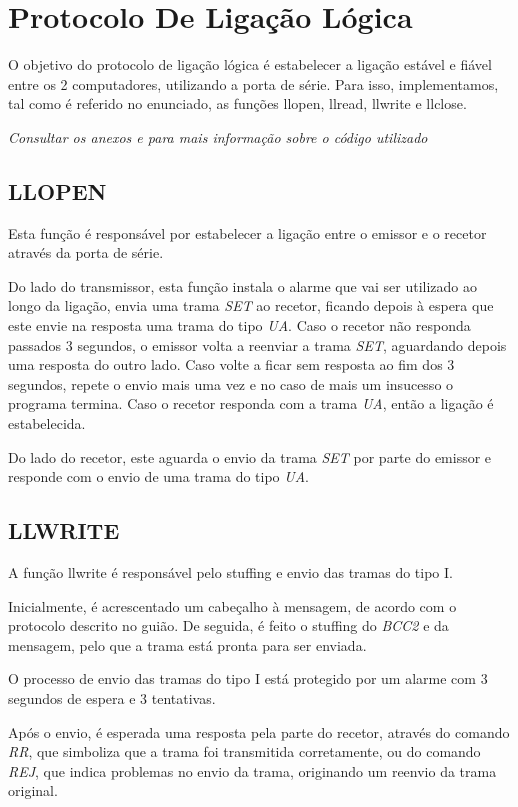 \documentclass[11pt]{article}
\begin{document}
\section{Protocolo De Ligação Lógica}

O objetivo do protocolo de ligação lógica é estabelecer a ligação estável e fiável entre os 2 computadores, utilizando a porta de série. Para isso, implementamos, tal como é referido no enunciado, as funções llopen, llread, llwrite e llclose.

\textit{Consultar os anexos  e  para mais informação sobre o código utilizado }

\subsection{LLOPEN}

Esta função é responsável por estabelecer a ligação entre o emissor e o recetor através da porta de série.

Do lado do transmissor, esta função instala o alarme que vai ser utilizado ao longo da ligação, envia uma trama \textit{SET} ao recetor, ficando depois à espera que este envie na resposta uma trama do tipo \textit{UA}. Caso o recetor não responda passados 3 segundos, o emissor volta a reenviar a trama \textit{SET}, aguardando depois uma resposta do outro lado. Caso volte a ficar sem resposta ao fim dos 3 segundos, repete o envio mais uma vez e no caso de mais um insucesso o programa termina. Caso o recetor responda com a trama \textit{UA}, então a ligação é estabelecida.

Do lado do recetor, este aguarda o envio da trama \textit{SET} por parte do emissor e responde com o envio de uma trama do tipo \textit{UA}.

\subsection{LLWRITE}

A função llwrite é responsável pelo stuffing e envio das tramas do tipo I.

Inicialmente, é acrescentado um cabeçalho à mensagem, de acordo com o protocolo descrito no guião. De seguida, é feito o stuffing do \textit{BCC2} e da mensagem, pelo que a trama está pronta para ser enviada.

O processo de envio das tramas do tipo I está protegido por um alarme com 3 segundos de espera e 3 tentativas.

Após o envio, é esperada uma resposta pela parte do recetor, através do comando \textit{RR}, que simboliza que a trama foi transmitida corretamente, ou do comando \textit{REJ}, que indica problemas no envio da trama, originando um reenvio da trama original.
\end{document}
